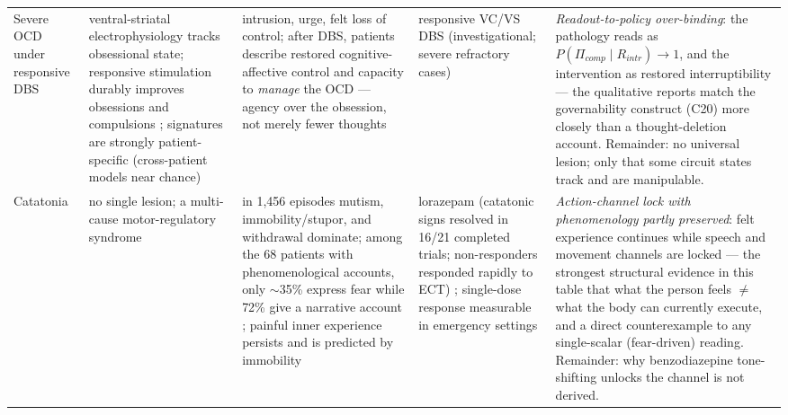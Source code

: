 \documentclass[9pt,twocolumn]{article}
\begin{document}
\begin{table}[!t]
\begin{tabularx}{\textwidth}{p{}p{}p{}p{}X}
Severe OCD under responsive DBS & ventral-striatal electrophysiology tracks obsessional state; responsive stimulation durably improves obsessions and compulsions \cite{provenza2024}; signatures are strongly patient-specific (cross-patient models near chance) \cite{fridgeirsson2023} & intrusion, urge, felt loss of control; after DBS, patients describe restored cognitive-affective control and capacity to \emph{manage} the OCD --- agency over the obsession, not merely fewer thoughts \cite{bosanac2023} & responsive VC/VS DBS (investigational; severe refractory cases) & \emph{Readout-to-policy over-binding}: the pathology reads as $P(\Pi_{comp}\mid R_{intr})\to1$, and the intervention as restored interruptibility --- the qualitative reports match the governability construct (C20) more closely than a thought-deletion account. Remainder: no universal lesion; only that some circuit states track and are manipulable. \\
Catatonia & no single lesion; a multi-cause motor-regulatory syndrome & in 1,456 episodes mutism, immobility/stupor, and withdrawal dominate; among the 68 patients with phenomenological accounts, only $\sim$35\% express fear while 72\% give a narrative account \cite{dawkins2022}; painful inner experience persists and is predicted by immobility \cite{subjcat2026,northoff1996} & lorazepam (catatonic signs resolved in 16/21 completed trials; non-responders responded rapidly to ECT) \cite{ungvari1996}; single-dose response measurable in emergency settings \cite{lorchallenge2021} & \emph{Action-channel lock with phenomenology partly preserved}: felt experience continues while speech and movement channels are locked --- the strongest structural evidence in this table that what the person feels $\neq$ what the body can currently execute, and a direct counterexample to any single-scalar (fear-driven) reading. Remainder: why benzodiazepine tone-shifting unlocks the channel is not derived. \\
\bottomrule
\end{tabularx}
\end{table}
\end{document}
